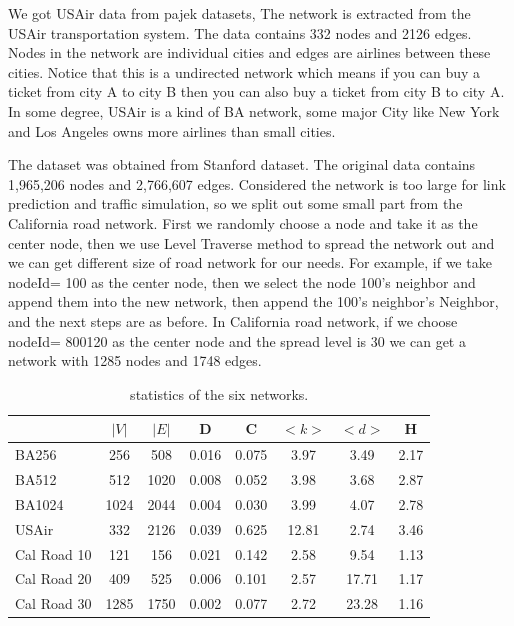 \documentclass[onecolumn,preprintnumbers,amsmath,amssymb]{revtex4}
\begin{document}

We got USAir data from pajek datasets, The network is extracted from the USAir transportation system. The data contains 332 nodes and 2126 edges. Nodes in the network are individual cities and edges are airlines between these cities. Notice that this is a undirected network which means if you can buy a ticket from city A to city B then you can also buy a ticket from city B to city A. In some degree, USAir is a kind of BA network, some major City like New York and Los Angeles owns more airlines than small cities.


The dataset was obtained from Stanford dataset. The original data contains 1,965,206 nodes and 2,766,607 edges. Considered the network is too large for link prediction and traffic simulation, so we split out some small part from the California road network. First we randomly choose a node and take it as the center node, then we use Level Traverse method to spread the network out and we can get different size of road network for our needs. For example, if we take nodeId= 100 as the center node, then we select the node 100’s neighbor and append them into the new network, then append the 100’s neighbor’s Neighbor, and the next steps are as before. In California road network, if we choose nodeId= 800120 as the center node and the spread level is 30 we can get a network with 1285 nodes and 1748 edges.


\begin{table}[tbp]
\centering  %
\begin{tabular}{lccccccc}  %
\hline  %
&$|V|$ &$|E|$ &D &C &$<k>$ &$<d>$ &H\\ 
\hline  BA256 &256 &508 &0.016 &0.075 &3.97 &3.49 &2.17 \\  
\hline  BA512 &512 &1020 &0.008 &0.052 &3.98 &3.68 &2.87 \\
\hline  BA1024 &1024 &2044 &0.004 &0.030 &3.99 &4.07 &2.78\\
\hline USAir &332 &2126 &0.039 &0.625 &12.81 &2.74 &3.46\\
\hline Cal Road 10 &121 &156 &0.021 &0.142 &2.58 &9.54 &1.13\\
\hline Cal Road 20 &409 &525 &0.006 &0.101 &2.57 &17.71 &1.17\\
\hline Cal Road 30 &1285 &1750 &0.002 &0.077 &2.72 &23.28 &1.16\\
\hline
\end{tabular}
\caption{statistics of the six networks.}
\end{table}
\end{document}
